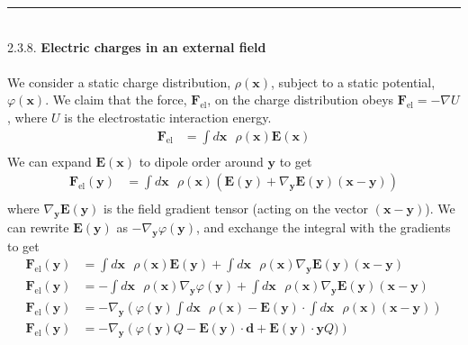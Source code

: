 \documentclass[]{article}
\begin{document}
\noindent\rule{15cm}{0.4pt} \\
2.3.8. {\bf Electric charges in an external field} \\
\\
We consider a static charge distribution, $\rho(\textbf{x})$, subject to a static potential, $\varphi(\textbf{x})$. We claim that the force, $\textbf{F}_{\text{el}}$, on the charge distribution obeys $\textbf{F}_{\text{el}} = -\nabla U$, where $U$ is the electrostatic interaction energy. 
\begin{equation}
\begin{split}
\textbf{F}_{\text{el}} & = \int d\textbf{x} \text{ }\rho(\textbf{x}) \textbf{E}(\textbf{x}) \\
\end{split}
\end{equation}
We can expand $\textbf{E}(\textbf{x})$ to dipole order around $\textbf{y}$ to get
\begin{equation}
\begin{split}
\textbf{F}_{\text{el}}(\textbf{y}) & = \int d\textbf{x} \text{ }\rho(\textbf{x})\left( \textbf{E}(\textbf{y})  + \nabla_\textbf{y}\textbf{E}(\textbf{y} )(\textbf{x} - \textbf{y} )\right) \\
\end{split}
\end{equation}
where $\nabla_\textbf{y}\textbf{E}(\textbf{y} )$ is the field gradient tensor (acting on the vector $(\textbf{x} - \textbf{y})$). We can rewrite $\textbf{E}(\textbf{y})$ as $-\nabla_\textbf{y}\varphi(\textbf{y})$, and exchange the integral with the gradients to get  \
\begin{equation}
\begin{split}
\textbf{F}_{\text{el}}(\textbf{y}) & = \int d\textbf{x} \text{ }\rho(\textbf{x}) \textbf{E}(\textbf{y})  +  \int d\textbf{x} \text{ }\rho(\textbf{x})\nabla_\textbf{y}\textbf{E}(\textbf{y} )(\textbf{x} - \textbf{y} ) \\
\textbf{F}_{\text{el}}(\textbf{y}) & = -\int d\textbf{x} \text{ }\rho(\textbf{x}) \nabla_\textbf{y}\varphi(\textbf{y})  +  \int d\textbf{x} \text{ }\rho(\textbf{x})\nabla_\textbf{y}\textbf{E}(\textbf{y} )(\textbf{x} - \textbf{y} ) \\
\textbf{F}_{\text{el}}(\textbf{y}) & = - \nabla_\textbf{y} \left(  \varphi(\textbf{y}) \int d\textbf{x} \text{ }\rho(\textbf{x})  -  \textbf{E}(\textbf{y} ) \cdot \int d\textbf{x} \text{ }\rho(\textbf{x})(\textbf{x} - \textbf{y} )  \right)\\
\textbf{F}_{\text{el}}(\textbf{y}) & = - \nabla_\textbf{y} \left(  \varphi(\textbf{y})Q -  \textbf{E}(\textbf{y} ) \cdot \textbf{d} + \textbf{E}(\textbf{y})\cdot\textbf{y}Q )  \right)\\
\end{split}
\end{equation}
\end{document}
